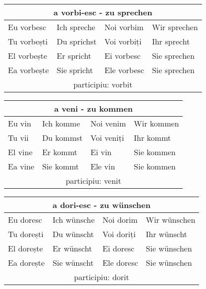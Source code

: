 \documentclass[11pt, oneside]{article}
\begin{document}
%
\begin{center}
  \begin{tabular}{ |p{3.25cm}|p{3.25cm}||p{3.25cm}|p{3.25cm}| }
      \hline
      \multicolumn{4}{|c|}{a vorbi-esc - zu sprechen} \\
      \hline
      \hline
      Eu vorbesc & Ich spreche & Noi vorbim & Wir sprechen\\
      \hline
      Tu vorbești & Du sprichst & Voi vorbiți & Ihr sprecht\\
      \hline
      El vorbește & Er spricht & Ei vorbesc & Sie sprechen\\ 
      Ea vorbește & Sie spricht & Ele vorbesc & Sie sprechen\\
      \hline
      \multicolumn{4}{|c|}{participiu: vorbit} \\
      \hline
     \end{tabular}
\end{center}
%
\begin{center}
  \begin{tabular}{ |p{3.25cm}|p{3.25cm}||p{3.25cm}|p{3.25cm}| }
      \hline
      \multicolumn{4}{|c|}{a veni - zu kommen} \\
      \hline
      \hline
      Eu vin & Ich komme & Noi venim & Wir kommen\\
      \hline
      Tu vii & Du kommst & Voi veniți & Ihr kommt\\
      \hline
      El vine & Er kommt & Ei vin & Sie kommen\\ 
      Ea vine & Sie kommt & Ele vin & Sie kommen\\
      \hline
      \multicolumn{4}{|c|}{participiu: venit} \\
      \hline
     \end{tabular}
\end{center}
%
\begin{center}
  \begin{tabular}{ |p{3.25cm}|p{3.25cm}||p{3.25cm}|p{3.25cm}| }
      \hline
      \multicolumn{4}{|c|}{a dori-esc - zu wünschen} \\
      \hline
      \hline
      Eu doresc & Ich wünsche & Noi dorim & Wir wünschen\\
      \hline
      Tu dorești & Du wünscht & Voi doriți & Ihr wünscht\\
      \hline
      El dorește & Er wünscht & Ei doresc & Sie wünschen\\ 
      Ea dorește & Sie wünscht & Ele doresc & Sie wünschen\\
      \hline
      \multicolumn{4}{|c|}{participiu: dorit} \\
      \hline
     \end{tabular}
\end{center}
\end{document}
